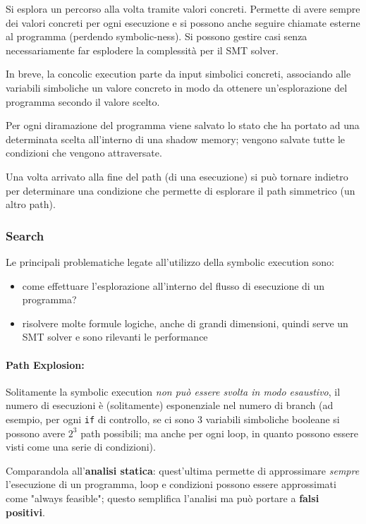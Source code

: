Si esplora un percorso alla volta tramite valori concreti. Permette di avere sempre dei valori concreti per ogni esecuzione e si possono anche seguire chiamate esterne al programma (perdendo symbolic-ness). Si possono gestire casi senza necessariamente far esplodere la complessità per il SMT solver.



In breve, la concolic execution parte da input simbolici concreti, associando alle variabili simboliche un valore concreto in modo da ottenere un'esplorazione del programma secondo il valore scelto. 

Per ogni diramazione del programma viene salvato lo stato che ha portato ad una determinata scelta all'interno di una shadow memory; vengono salvate tutte le condizioni che vengono attraversate. 

Una volta arrivato alla fine del path (di una esecuzione) si può tornare indietro per determinare una condizione che permette di esplorare il path simmetrico (un altro path).

\subsubsection{Search}

Le principali problematiche legate all'utilizzo della symbolic execution sono:
\begin{itemize}
	\item come effettuare l'esplorazione all'interno del flusso di esecuzione di un programma?

	\item risolvere molte formule logiche, anche di grandi dimensioni, quindi serve un SMT solver e sono rilevanti le performance
\end{itemize}

\paragraph{Path Explosion:} Solitamente la symbolic execution \textit{non può essere svolta in modo esaustivo}, il numero di esecuzioni è (solitamente) esponenziale nel numero di branch (ad esempio, per ogni \texttt{if} di controllo, se ci sono 3 variabili simboliche booleane si possono avere $2^3$ path possibili; ma anche per ogni loop, in quanto possono essere visti come una serie di condizioni).

Comparandola all'\textbf{analisi statica}: quest'ultima permette di approssimare \textit{sempre} l'esecuzione di un programma, loop e condizioni possono essere approssimati come "always feasible"; questo semplifica l'analisi ma può portare a \textbf{falsi positivi}. 

